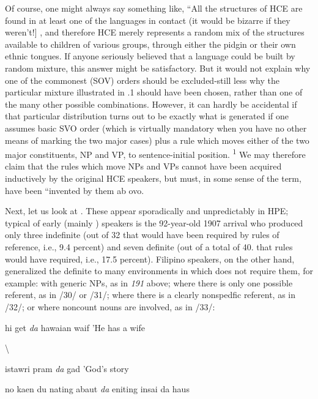 Of course, one might always say something like, ``All the struc\-tures of HCE are found in at least one of the languages in contact (it would be bizarre if they weren't!] , and therefore HCE merely repre\-sents a random mix of the structures available to children of various groups, through either the pidgin or their own ethnic tongues. If anyone seriously believed that a language could be built by random mixture, this answer might be satisfactory. But it would not explain why one of the commonest (SOV) orders should be excluded-still less why the particular mixture illustrated in .1 should have been chosen, rather than one of the many other possible combinations. However, it can hardly be accidental if that particular distribution turns out to be exactly what is generated if one assumes basic SVO order (which is virtually mandatory when you have no other means of mark\-ing the two major cases) plus a rule which moves either of the two major constituents, NP and VP, to sentence-initial position. \textsuperscript{1} We may 
therefore claim that the rules which move NPs and VPs cannot have been acquired inductively by the original HCE speakers, but must, in some sense of the term, have been ``invented by them ab ovo.

Next, let us look at . These appear sporadically and unpredictably in HPE; typical of early (mainly ) speakers is the 92-year-old 1907 arrival who produced only three indefinite  (out of 32 that would have been required by  rules of reference, i.e., 9.4 percent) and seven definite  (out of a total of 40. that  rules would have required, i.e., 17.5 percent). Filipino speakers, on the other hand, generalized the definite  to many environ\-ments in which  does not require them, for example: with generic NPs, as in \textit{191} above; where there is only one possible refer\-ent, as in /30/ or /31/; where there is a clearly nonspedfic referent, as in /32/; or where noncount nouns are involved, as in /33/:

\ea\label{ex:30}
 hi get \textit{da} hawaian waif 'He has a  wife
\glt
\z

{\textbackslash}


\ea\label{ex:31}
 istawri pram \textit{da} gad 'God's story
\glt
\z

\ea\label{ex:32}
 no kaen du nating abaut \textit{da} eniting insai da haus
\glt
\z

